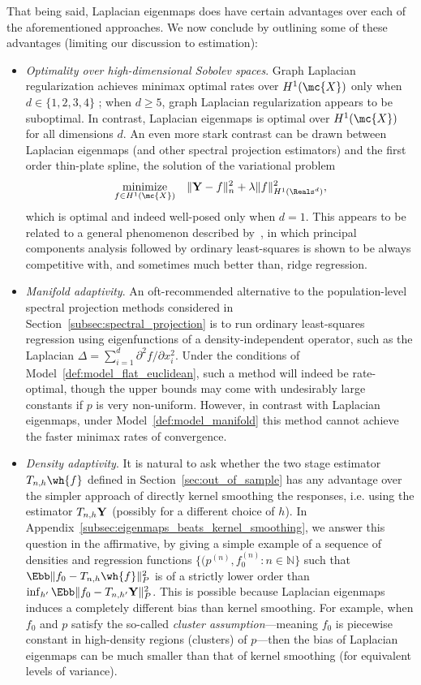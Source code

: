 That being said, Laplacian eigenmaps does have certain advantages over each of the aforementioned approaches. We now conclude by outlining some of these advantages (limiting our discussion to estimation):
\begin{itemize}
	\item \emph{Optimality over high-dimensional Sobolev spaces}. Graph Laplacian regularization achieves minimax optimal rates over $H^1(\mc{X})$ only when $d \in \{1,2,3,4\}$ \citep{sadhanala16, green2021}; when $d \geq 5$, graph Laplacian regularization appears to be suboptimal. In contrast, Laplacian eigenmaps is optimal over $H^1(\mc{X})$ for all dimensions $d$.  An even more stark contrast can be drawn between Laplacian eigenmaps (and other spectral projection estimators) and the first order thin-plate spline, the solution of the variational problem
	\begin{equation}
	\underset{f \in H^1(\mc{X})}{\textrm{minimize}} \quad  \|{\bf Y} - f\|_n^2 + \lambda \|f\|_{H^1(\Reals^d)}^2,
	\end{equation}
	which is optimal and indeed well-posed only when $d = 1$. This appears to be related to a general phenomenon described by~\cite{dhillon2013,dicker2017}, in which principal components analysis followed by ordinary least-squares is shown to be always competitive with, and sometimes much better than, ridge regression. 
	\item \emph{Manifold adaptivity}. An oft-recommended alternative to the population-level spectral projection methods considered in Section~\ref{subsec:spectral_projection} is to run ordinary least-squares regression using eigenfunctions of a density-independent operator, such as the Laplacian $\Delta = \sum_{i = 1}^{d} \partial^2f/\partial x_i^2$. Under the conditions of Model~\ref{def:model_flat_euclidean}, such a method will indeed be rate-optimal, though the upper bounds may come with undesirably large constants if $p$ is very non-uniform. However, in contrast with Laplacian eigenmaps, under Model~\ref{def:model_manifold} this method cannot achieve the faster minimax rates of convergence.
	\item \emph{Density adaptivity}. It is natural to ask whether the two stage estimator $T_{n,h}\wh{f}$ defined in Section~\ref{sec:out_of_sample} has any advantage over the simpler approach of directly kernel smoothing the responses, i.e. using the estimator $T_{n,h}{\bf Y}$ (possibly for a different choice of $h$). In Appendix~\ref{subsec:eigenmaps_beats_kernel_smoothing}, we answer this question in the affirmative, by giving a simple example of a sequence of densities and regression functions $\{(p^{(n)}, f_0^{(n)}: n \in \mathbb{N}\}$ such that $\Ebb\|f_0 - T_{n,h}\wh{f}\|_P^2$ is of a strictly lower order than $\inf_{h'} \Ebb\|f_0 - T_{n,h'}{\bf Y}\|_P^2$. This is possible because Laplacian eigenmaps induces a completely different bias than kernel smoothing. For example, when $f_0$ and $p$ satisfy the so-called \emph{cluster assumption}---meaning $f_0$ is piecewise constant in high-density regions (clusters) of $p$---then the bias of Laplacian eigenmaps can be much smaller than that of kernel smoothing (for equivalent levels of variance). 
	

\end{itemize}
